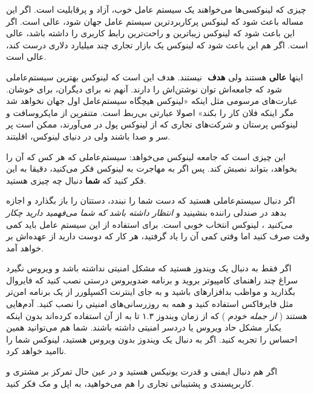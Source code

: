 چیزی که لینوکسی‌ها می‌خواهند یک سیستم عامل خوب، آزاد و پرقابلیت است. اگر این مساله باعث شود که لینوکس پرکاربردترین سیستم عامل جهان شود، عالی است. اگر این باعث شود که لینوکس زیباترین و راحت‌ترین رابط کاربری را داشته باشد، عالی است. اگر هم این باعث شود که لینوکس یک بازار تجاری چند میلیارد دلاری درست کند، عالی است.

اینها
\textbf{عالی}
هستند ولی
\textbf{هدف}
‌ نیستند. هدف این است که لینوکس بهترین سیستم‌عاملی شود که جامعه‌اش توان نوشتن‌اش را دارند. آنهم نه برای دیگران، برای خوشان. عبارت‌های مرسومی مثل اینکه «لینوکس هیچگاه سیستم‌عامل اول جهان نخواهد شد مگر اینکه فلان کار را بکند» اصولا عبارتی بی‌ربط است. متنفرین از مایکروسافت و لینوکس پرستان و شرکت‌های تجاری که از لینوکس پول در می‌آورند، ممکن است پر سر و صدا باشند ولی در دنیای لینوکس،‌ اقلیتند.

این چیزی است که جامعه لینوکس می‌خواهد: سیستم‌عاملی که هر کس که آن را بخواهد، بتواند نصبش کند. پس اگر به مهاجرت به لینوکس فکر می‌کنید، دقیقا به این فکر کنید که
\textbf{شما}
دنبال چه چیزی هستید.

اگر دنبال سیستم‌عاملی هستید که دست شما را نبندد، دستتان را باز بگذارد و اجازه بدهد در صندلی راننده بنشینید و
\emph{انتظار داشته باشد که شما می‌فهمید دارید چکار می‌کنید}
، لینوکس انتخاب خوبی است. برای استفاده از این سیستم عامل باید کمی وقت صرف کنید اما وقتی کمی آن را یاد گرفتید، هر کار که دوست دارید از عهده‌اش بر خواهد آمد.

اگر فقط به دنبال یک ویندوز هستید که مشکل امنیتی نداشته باشد و ویروس نگیرد سراغ چند راهنمای کامپیوتر بروید و برنامه ضدویروس درستی نصب کنید که فایروال بگذارید و مواظب بدافزارهای باشید و به جای اینترنت اکسپلورر از یک برنامه امن‌تر مثل فایرفاکس استفاده کنید و همه به روزرسانی‌های امنیتی را نصب کنید. آدم‌هایی هستند (
\emph{از جمله خودم}
) که از زمان ویندوز ۱.۳ تا به 
از آن استفاده کرده‌اند بدون اینکه یکبار مشکل حاد ویروس یا دردسر امنیتی داشته باشند. شما هم می‌توانید همین احساس را تجربه کنید. اگر به دنبال یک ویندوز بدون ویروس هستید، لینوکس شما را ناامید خواهد کرد.

اگر هم دنبال ایمنی و قدرت یونیکس هستید و در عین حال تمرکز بر مشتری و کاربرپسندی و پشتیبانی تجاری را هم می‌خواهید‌، به اپل و مک فکر کنید.

